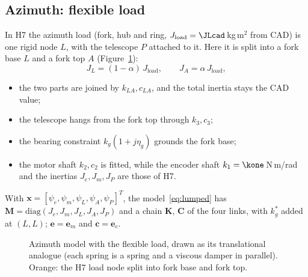 \documentclass[10pt,a4paper]{article}
\numberwithin{equation}{section}
\newcommand{\ground}[3]{\draw[thick] (#1,#3) -- (#2,#3); \fill[pattern=north east lines] (#1,#3) rectangle (#2,#3-0.18);}
\begin{document}
\subsection{Azimuth: flexible load}\label{sec:azmodel}
In H7 the azimuth load (fork, hub and ring, $J_\mathrm{load}=\JLcad$\,kg\,m$^2$ from CAD) is one rigid node $L$, with the telescope $P$ attached to it. Here it is split into a fork base $L$ and a fork top $A$ (Figure~\ref{fig:az}):
\begin{equation}
J_L=(1-\alpha)\,J_\mathrm{load},\qquad J_A=\alpha\,J_\mathrm{load},
\end{equation}
\begin{itemize}
\item the two parts are joined by $k_{LA},c_{LA}$, and the total inertia stays the CAD value;
\item the telescope hangs from the fork top through $k_3,c_3$;
\item the bearing constraint $k_g(1+j\eta_g)$ grounds the fork base;
\item the motor shaft $k_2,c_2$ is fitted, while the encoder shaft $k_1=\kone$\,N\,m/rad and the inertias $J_e,J_m,J_P$ are those of H7.
\end{itemize}
With $\mathbf x=[\psi_e,\psi_m,\psi_L,\psi_A,\psi_P]^T$, the model~\eqref{eq:lumped} has $\mathbf M=\mathrm{diag}(J_e,J_m,J_L,J_A,J_P)$ and a chain $\mathbf K$, $\mathbf C$ of the four links, with $k_g^*$ added at $(L,L)$; $\mathbf e=\mathbf e_m$ and $\mathbf c=\mathbf e_e$.

\begin{figure}[H]\centering
{}
\caption{Azimuth model with the flexible load, drawn as its translational analogue (each spring is a spring and a viscous damper in parallel). Orange: the H7 load node split into fork base and fork top.}\label{fig:az}
\end{figure}
\end{document}
